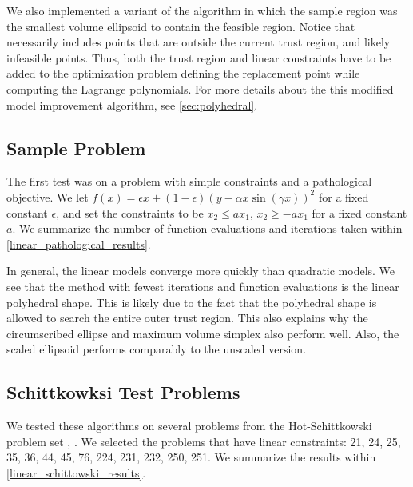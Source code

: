 We also implemented a variant of the algorithm in which the sample region was the smallest volume ellipsoid to contain the feasible region.
Notice that necessarily includes points that are outside the current trust region, and likely infeasible points.
Thus, both the trust region and linear constraints have to be added to the optimization problem defining the replacement point while computing the Lagrange polynomials.
For more details about the this modified model improvement algorithm, see \cref{sec:polyhedral}.

\subsection{Sample Problem}
The first test was on a problem with simple constraints and a pathological objective.
We let $f(x) = \epsilon x + (1-\epsilon)(y - \alpha x \sin(\gamma x))^2$ for a fixed constant $\epsilon$, and set the constraints to be
$x_2 \le ax_1$, $x_2 \ge -ax_1$ for a fixed constant $a$.
We summarize the number of function evaluations and iterations taken within \cref{linear_pathological_results}.

In general, the linear models converge more quickly than quadratic models.
We see that the method with fewest iterations and function evaluations is the linear polyhedral shape.
This is likely due to the fact that the polyhedral shape is allowed to search the entire outer trust region.
This also explains why the circumscribed ellipse and maximum volume simplex also perform well.
Also, the scaled ellipsoid performs comparably to the unscaled version.

\subsection{Schittkowksi Test Problems}


We tested these algorithms on several problems from the Hot-Schittkowski problem set \cite{Schittkowski:1987:MTE:27135}, \cite{Hock1980}.
We selected the problems that have linear constraints: 21, 24, 25, 35, 36, 44, 45, 76, 224, 231, 232, 250, 251.
We summarize the results within \cref{linear_schittowski_results}.


